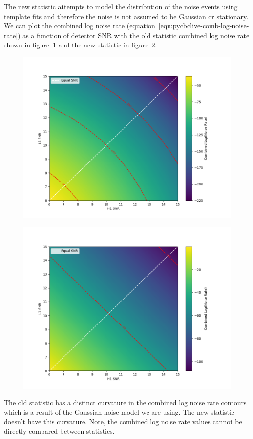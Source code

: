 The new statistic attempts to model the distribution of the noise events using template fits and therefore the noise is not assumed to be Gaussian or stationary. We can plot the combined log noise rate (equation~\ref{eqn:pycbclive-comb-log-noise-rate}) as a function of detector SNR with the old statistic combined log noise rate shown in figure~\ref{fig:pycbclive-comb-lognoise-old} and the new statistic in figure~\ref{fig:pycbclive-comb-lognoise-new}.
%
\begin{figure}
    \centering
    \includegraphics[width=1\textwidth]{images/5_pycbclive/comb_lognoise_old_stat.png}
    \caption{}
    \label{fig:pycbclive-comb-lognoise-old}
\end{figure}
%
\begin{figure}
    \centering
    \includegraphics[width=1\textwidth]{images/5_pycbclive/comb_lognoise_new_stat.png}
    \caption{}
    \label{fig:pycbclive-comb-lognoise-new}
\end{figure}
%
The old statistic has a distinct curvature in the combined log noise rate contours which is a result of the Gaussian noise model we are using. The new statistic doesn't have this curvature. Note, the combined log noise rate values cannot be directly compared between statistics.

